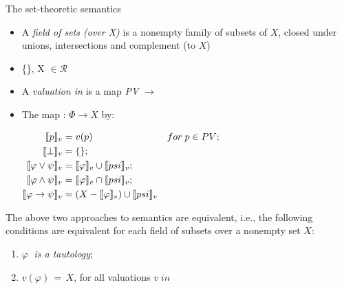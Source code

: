\documentclass[sans]{beamer}
\begin{document}
\begin{frame}{The set-theoretic semantics}
  \begin{itemize}
    \item A \emph{field of sets (over X)} is a nonempty family \calr
      of subsets of $X$, closed under unions, intersections and complement (to $X$)
    
    \item \{\}, X $\in \mathcal{R}$
    
    \item A \emph{valuation in} \calr is a map \emph{PV} $\to$ \calr
      
    \vfill

    \item The map \vmsem{\bullet} : $\Phi \to X$ by:

      $\begin{aligned}
        \llbracket p \rrbracket_v &= v(p) & for \; p \in PV; \\
        \llbracket \bot \rrbracket_v &= \{\}; \\
        \llbracket \varphi \vee \psi \rrbracket_v &= \llbracket \varphi \rrbracket_v \cup \llbracket psi \rrbracket_v; \\
        \llbracket \varphi \wedge \psi \rrbracket_v &= \llbracket \varphi \rrbracket_v \cap \llbracket psi \rrbracket_v;\\
        \llbracket \varphi \to \psi \rrbracket_v &= (X - \llbracket \varphi \rrbracket_v) \cup \llbracket psi \rrbracket_v
       \end{aligned}$
  \end{itemize}
\end{frame}

\begin{frame}{}
  The above two approaches to semantics are equivalent, i.e., the following conditions
  are equivalent for each field of subsets \calr over a nonempty set $X$:
  \begin{enumerate}
    \item $\varphi \;$ \emph{is a tautology};
    \item $v(\varphi) \,=\, X$, for all valuations $v \; in \; $\calr
  \end{enumerate}
\end{frame}
\end{document}
